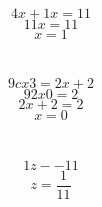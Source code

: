 \documentclass{article}
\begin{document}
\section{}
$$4x + 1 x = 11
$$$$11x = 11
$$$$x = 1
$$\section{}
$$9c x 3 = 2x + 2
$$$$92x 0 = 2
$$$$2x + 2 = 2
$$$$x = 0
$$\section{}
$$1z - - 11
$$$$z = \frac{1}{11}
$$
\end{document}
